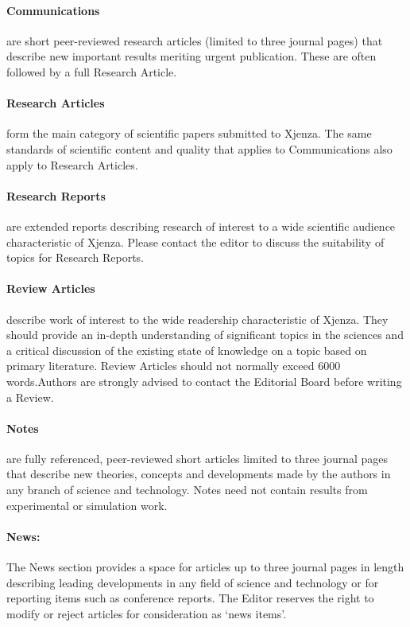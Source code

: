 \paragraph{Communications} are short peer-reviewed research articles (limited to three journal pages) that describe new important results meriting urgent publication. These are often followed by a full Research Article.

\paragraph{Research Articles} form the main category of scientific papers submitted to Xjenza. The same standards of scientific content and quality that applies to Communications also apply to Research Articles.

\paragraph{Research Reports} are extended reports describing research of interest to a wide scientific audience characteristic of Xjenza. Please contact the editor to discuss the suitability of topics for Research Reports.

\paragraph{Review Articles} describe work of interest to the wide readership characteristic of Xjenza. They should provide an in-depth understanding of significant topics in the sciences and a critical discussion of the existing state of knowledge on a topic based on primary literature. Review Articles should not normally exceed 6000 words.Authors are strongly advised to contact the Editorial Board before writing a Review.

\paragraph{Notes} are fully referenced, peer-reviewed short articles limited to three journal pages that describe new theories, concepts and developments made by the authors in any branch of science and technology. Notes need not contain results from experimental or simulation work.

\paragraph{News:} The News section provides a space for articles up to three journal pages in length describing leading developments in any field of science and technology or for reporting items such as conference reports. The Editor reserves the right to modify or reject articles for consideration as `news items'.

